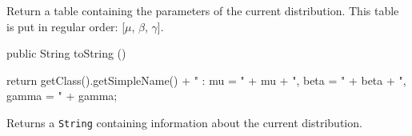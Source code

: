 \begin{tabb}
   Return a table containing the parameters of the current distribution.
   This table is put in regular order: [$\mu$, $\beta$, $\gamma$].
\end{tabb}
\begin{hide}\begin{code}

   public String toString ()\begin{hide} {
      return getClass().getSimpleName() + " : mu = " + mu + ", beta = " + beta + ", gamma = " + gamma;
   }\end{hide}
\end{code}
\begin{tabb}
   Returns a \texttt{String} containing information about the current distribution.
\end{tabb}\end{hide}
\begin{code}\begin{hide}
}\end{hide}
\end{code}
